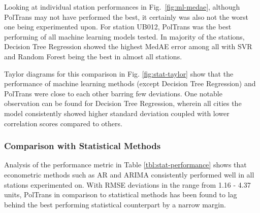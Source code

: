 \documentclass[10pt,journal]{IEEEtran}
\begin{document}
Looking at individual station performances in Fig.~\ref{fig:ml-medae}, although {PolTrans}  may not have performed the best, it certainly was also not the worst one being experimented upon. For station UB012, {PolTrans}  was the best performing of all machine learning models tested. In majority of the stations, Decision Tree Regression showed the highest MedAE error among all with SVR and Random Forest being the best in almost all stations. 

Taylor diagrams for this comparison in Fig. \ref{fig:stat-taylor} show that the performance of machine learning methods (except Decision Tree Regression) and {PolTrans}  were close to each other barring few deviations. One notable observation can be found for Decision Tree Regression, wherein all cities the model consistently showed higher standard deviation coupled with lower correlation scores compared to others.

\subsubsection{Comparison with Statistical Methods}

Analysis of the performance metric in Table \ref{tbl:stat-performance} shows that econometric methods such as AR and ARIMA consistently performed well in all stations experimented on. With RMSE deviations in the range from 1.16 - 4.37 units, {PolTrans}  in comparison to statistical methods has been found to lag behind the best performing statistical counterpart by a narrow margin.
\end{document}
